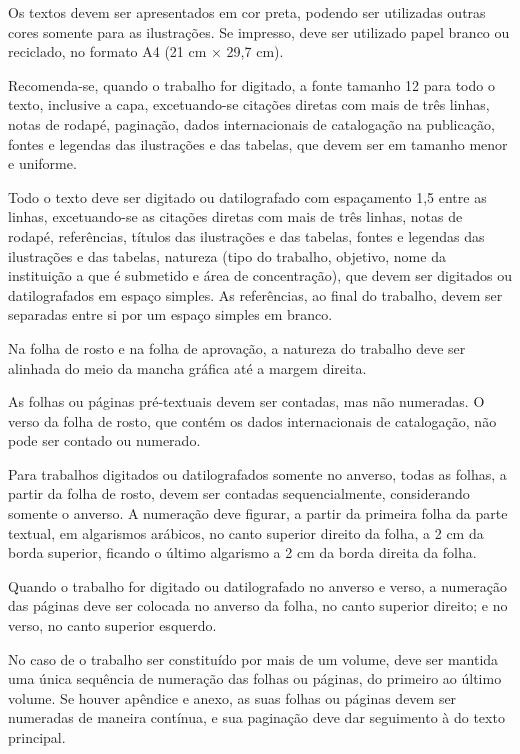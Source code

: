 \documentclass{Arquivos/TrabalhoAcademico}
\begin{document}
Os textos devem ser apresentados em cor preta, podendo ser utilizadas outras cores somente para
as ilustrações. Se impresso, deve ser utilizado papel branco ou reciclado, no formato A4 (21 cm × 29,7 cm).

Recomenda-se, quando o trabalho for digitado, a fonte tamanho 12 para todo o texto, inclusive a
capa, excetuando-se citações diretas com mais de três linhas, notas de rodapé, paginação, dados
internacionais de catalogação na publicação, fontes e legendas das ilustrações e das tabelas, que
devem ser em tamanho menor e uniforme.

Todo o texto deve ser digitado ou datilografado com espaçamento 1,5 entre as linhas, excetuando-se as citações diretas com mais de três linhas, notas de rodapé, referências, títulos das ilustrações e das tabelas, fontes e legendas das ilustrações e das tabelas, natureza (tipo do trabalho, objetivo, nome da instituição a que é submetido e área de concentração), que devem ser digitados ou datilografados em espaço simples. As referências, ao final do trabalho, devem ser separadas entre si por um espaço simples em branco. 

Na folha de rosto e na folha de aprovação, a natureza do trabalho deve ser alinhada do meio da mancha gráfica até a margem direita.

As folhas ou páginas pré-textuais devem ser contadas, mas não numeradas. O verso da folha de rosto, que contém os dados internacionais de catalogação, não pode ser contado ou numerado.

Para trabalhos digitados ou datilografados somente no anverso, todas as folhas, a partir da folha de rosto, devem ser contadas sequencialmente, considerando somente o anverso. A numeração deve figurar, a partir da primeira folha da parte textual, em algarismos arábicos, no canto superior direito da folha, a 2 cm da borda superior, ficando o último algarismo a 2 cm da borda direita da folha.

Quando o trabalho for digitado ou datilografado no anverso e verso, a numeração das páginas deve ser colocada no anverso da folha, no canto superior direito; e no verso, no canto superior esquerdo. 

No caso de o trabalho ser constituído por mais de um volume, deve ser mantida uma única sequência de numeração das folhas ou páginas, do primeiro ao último volume. Se houver apêndice e anexo, as suas folhas ou páginas devem ser numeradas de maneira contínua, e sua paginação deve dar seguimento à do texto principal.
\end{document}
